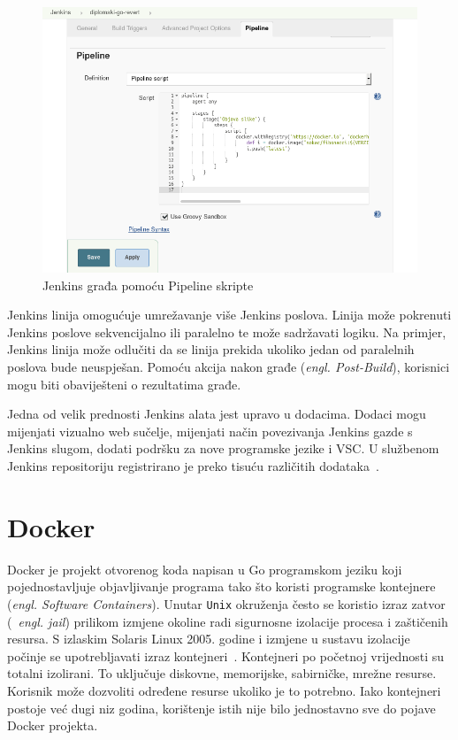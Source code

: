 \begin{figure}[h]
    \centering
    \includegraphics[width=\textwidth]{img/02/jenkins_pipeline.png}
    \caption{Jenkins građa pomoću Pipeline skripte}%
    \label{fig:02jenkins_pipeline}
\end{figure}

Jenkins linija omogućuje umrežavanje više Jenkins poslova. Linija može pokrenuti Jenkins poslove
sekvencijalno ili paralelno te može sadržavati logiku. Na primjer, Jenkins linija može odlučiti da
se linija prekida ukoliko jedan od paralelnih poslova bude neuspješan. Pomoću akcija nakon građe
(\textit{engl. Post-Build}), korisnici mogu biti obaviješteni o rezultatima građe.

Jedna od velik prednosti Jenkins alata jest upravo u dodacima. Dodaci mogu mijenjati vizualno web
sučelje, mijenjati način povezivanja Jenkins gazde s Jenkins slugom, dodati podršku za nove
programske jezike i VSC. U službenom Jenkins repositoriju registrirano je preko tisuću različitih
dodataka~\citep{JenkisPlugins}.

\section{Docker}
Docker je projekt otvorenog koda napisan u Go programskom jeziku koji pojednostavljuje objavljivanje
programa tako što koristi programske kontejnere (\textit{engl. Software Containers}). Unutar
\texttt{Unix} okruženja često se koristio izraz zatvor (~\textit{engl. jail}) prilikom izmjene
okoline radi sigurnosne izolacije procesa i zaštičenih resursa. S izlaskim Solaris Linux 2005.
godine i izmjene u sustavu izolacije počinje se upotrebljavati izraz
kontejneri~\citep{nickoloff2016docker}. Kontejneri po početnoj vrijednosti su totalni izolirani. To
uključuje diskovne, memorijske, sabirničke, mrežne resurse. Korisnik može dozvoliti određene resurse
ukoliko je to potrebno. Iako kontejneri postoje već dugi niz godina, korištenje istih nije bilo
jednostavno sve do pojave Docker projekta.

